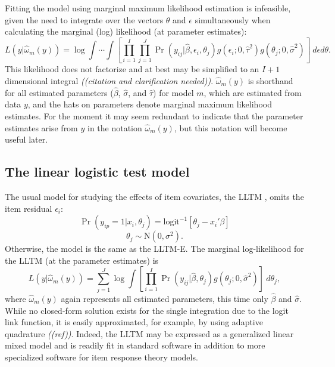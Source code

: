 Fitting the model using marginal maximum likelihood estimation is infeasible, given the need to integrate over the vectors $\theta$ and $\epsilon$ simultaneously when calculating the marginal (log) likelihood (at parameter estimates):
\begin{equation} \label{eq:lltme-likelihood}
	L(y | \hat \omega_m(y)) = \log 
		\int \cdots \int \left [
			\prod_{i=1}^I \prod_{j=1}^J
			\Pr(y_{ij} | \hat \beta, \epsilon_i, \theta_j)
			g(\epsilon_i ; 0, \hat \tau^2)
			g(\theta_j ; 0, \hat \sigma^2)
		\right ] ~d \epsilon d \theta
.\end{equation}
This likelihood does not factorize and at best may be simplified to an $I+1$ dimensional integral \emph{((citation and clarification needed))}.
$\hat \omega_m(y)$ is shorthand for all estimated parameters ($\hat \beta$, $\hat \sigma$, and $\hat \tau$) for model $m$, which are estimated from data $y$, and the hats on parameters denote marginal maximum likelihood estimates. For the moment it may seem redundant to indicate that the parameter estimates arise from $y$ in the notation $\hat \omega_m(y)$, but this notation will become useful later.


\subsection{The linear logistic test model}

The usual model for studying the effects of item covariates, the LLTM \parencite[][]{Fischer1973}, omits the item residual $\epsilon_i$:
\begin{equation}
	\Pr(y_{ip} = 1 | x_i, \theta_j) =
	\mathrm{logit}^{-1} \left [ \theta_j - x_i'\beta \right ]
\end{equation}
\begin{equation}
	\theta_j \sim \mathrm{N}(0, \sigma^2)
.\end{equation}
Otherwise, the model is the same as the LLTM-E.
The marginal log-likelihood for the LLTM (at the parameter estimates) is
\begin{equation} \label{eq:lltm-likelihood}
	L(y | \hat \omega_m(y)) = 
	\sum_{j=1}^J \log
	\int \left [
		\prod_{i=1}^I
		\Pr(y_{ij} | \hat \beta, \theta_j)
		g(\theta_j ; 0, \hat \sigma^2)
	\right ] ~d \theta_j
,\end{equation}
where $\hat \omega_m(y)$ again represents all estimated parameters, this time only $\hat \beta$ and $\hat \sigma$.
While no closed-form solution exists for the single integration due to the logit link function, it is easily approximated, for example, by using adaptive quadrature \emph{((ref))}. Indeed, the LLTM may be expressed as a generalized linear mixed model and is readily fit in standard software in addition to more specialized software for item response theory models.


